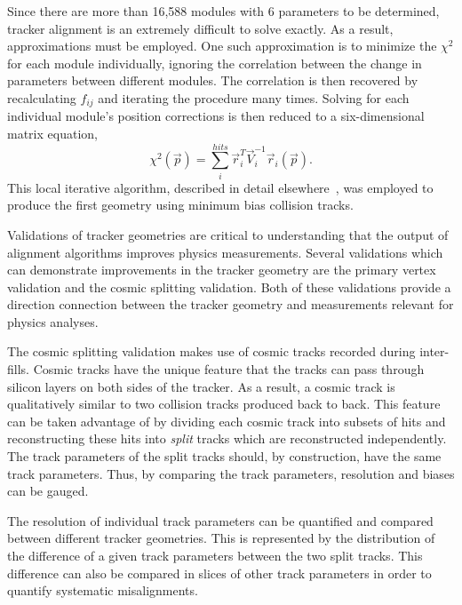 Since there are more than 16,588 modules with 6 parameters to be
determined, tracker alignment is an extremely difficult to solve
exactly.  As a result, approximations 
must be employed.   One such approximation is to minimize the
$\chi^2$ for each module individually, ignoring the correlation
between the change in parameters between different modules.  The 
correlation is then recovered 
by recalculating $f_{ij}$ and iterating the procedure many times.
Solving for each individual module's position corrections is then 
reduced to a six-dimensional  matrix equation, 
\begin{equation}
\chi^2(\vec{p})=\sum_i^{hits}\vec{r}^T_i\vec{V}_i^{-1}\vec{r}_i(\vec{p}).
\end{equation}
This local iterative algorithm, described in detail 
elsewhere~\cite{Karimaki:2006az,Brown:2008ccb}, was employed to produce 
the first geometry using minimum bias collision tracks.  

Validations of tracker geometries are critical to understanding 
that the output of alignment algorithms improves physics
measurements.  Several validations which can demonstrate
improvements in the tracker geometry are the primary vertex 
validation and the cosmic splitting validation.  Both of these 
validations provide a direction connection between the 
tracker geometry and measurements relevant for physics analyses.   

The cosmic splitting validation makes use of cosmic tracks recorded 
during inter-fills.  Cosmic tracks have the unique feature that the 
tracks can pass through silicon layers on both sides of the 
tracker.  As a result, a cosmic track is qualitatively similar to 
two collision tracks produced back to back.  This feature can be 
taken advantage of by dividing
each cosmic track into subsets of hits and reconstructing these hits 
into {\it split} tracks which are reconstructed independently.  The 
track parameters of the 
split tracks should, by construction, have the same track 
parameters.  Thus, by comparing the track parameters, 
resolution and biases can be gauged.  

The resolution of individual track parameters can be quantified
and compared between different tracker geometries.  This is
represented by the distribution of the difference of a given 
track parameters between the two split tracks.  This difference
can also be compared in slices of other track parameters in 
order to quantify systematic misalignments.


